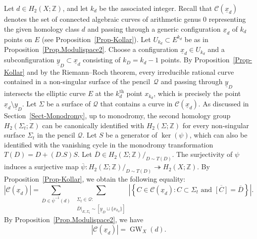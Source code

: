 \documentclass[10pt,a4paper]{article}
\numberwithin{equation}{section}
\theoremstyle{definition}
\theoremstyle{plain}
\theoremstyle{remark}
\newcommand{\Z}{\mathbb{Z}}
\DeclareMathOperator{\GW}{GW}
\newcommand{\supth}[1]{\ensuremath{#1^{\mathrm{th}}}}
\begin{document}
Let $d\in H_2(X;\Z)$, and let $k_d$ be the associated integer.  Recall that $\mathcal{C}(\underline{x}_d)$ denotes the set of connected algebraic curves of arithmetic genus $0$ representing the given homology class $d$ and passing through a generic configuration $\underline{x}_d$ of $k_d$ points on $E$ (see Proposition~\ref{Prop-Kollar}).  Let ${U}_{k_d}\subset E^{k_d}$ be as in Proposition~\ref{Prop.Modulispace2}. Choose a configuration $\underline{x}_d\in {U}_{k_d}$ and a subconfiguration $\underline{y}_D\subset \underline{x}_d$ consisting of $k_D=k_d-1$ points.  By Proposition~\ref{Prop-Kollar} and by the Riemann--Roch theorem, every irreducible rational curve contained in a non-singular surface of the pencil~$\mathcal{Q}$ and passing through $\underline{y}_D$ intersects the elliptic curve $E$ at the $\supth{k_d}$ point $x_{k_d}$, which is precisely the point $\underline{x}_d\setminus \underline{y}_D$.  Let $\Sigma$ be a surface of $\mathcal{Q}$ that contains a curve in $\mathcal{C}(\underline{x}_d)$.  As discussed in Section~\ref{Sect-Monodromy}, up to monodromy, the second homology group $H_2(\Sigma_t;\Z)$ can be canonically identified with $H_2(\Sigma;\Z)$ for every non-singular surface $\Sigma_t$ in the pencil $\mathcal{Q}$.  Let $S$ be a generator of $\ker(\psi)$, which can also be identified with the vanishing cycle in the monodromy transformation $T(D)=D+(D.S)S$.  Let $\overline{D}\in H_2(\Sigma;\Z)/_ {D\sim T(D)}$.  The surjectivity of $\psi$ induces a surjective map $\overline{\psi}\colon H_2(\Sigma;\Z)/_ {D\sim T(D)}\twoheadrightarrow H_2(X;\Z)$. By Proposition~\ref{Prop-Kollar}, we obtain the following equality:
    \begin{equation*}
        \left|\mathcal{C}\left(\underline{x}_d\right)\right|=\sum_{\overline{D}\in \overline{\psi}^{-1}(d)}\;\sum_{\substack{\Sigma_t\in\mathcal{Q}:\\
                 \overline{D}|_{E,\Sigma_t}\sim [\underline{y}_D\sqcup \{x_{k_d}\}]
                 }}\left|\left\{C\in \mathcal{C}\left(\underline{x}_d\right): C \subset \Sigma_t \text{ and } \overline{[C]}=\overline{D} \right\}\right|.
    \end{equation*}
    By Proposition~\ref{Prop.Modulispace2}, we have
    $$\left|\mathcal{C}(\underline{x}_d)\right|=\GW_X(d).$$
\end{document}
